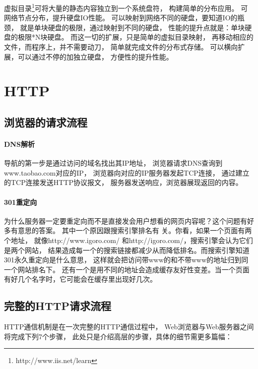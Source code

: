 \documentclass{book}
\begin{document}
虚拟目录\footnote{http://www.iis.net/learn}可将大量的静态内容独立到一个系统盘符，
构建简单的分布应用。
可网络节点分布，提升硬盘IO性能。
可以映射到网络不同的硬盘，要知道IO的瓶颈，
就是单块硬盘的极限，通过映射到不同的硬盘，
性能的提升点就是：单块硬盘的极限*N块硬盘。
而这一切的扩展，只是简单的虚拟目录映射，
再移动相应的文件，而程序上，并不需要动刀，
简单就完成文件的分布式存储。
可以横向扩展，可以通过不停的加独立硬盘，
方便性的提升性能。

\section{HTTP}

\subsection{浏览器的请求流程}

\paragraph{DNS解析}导航的第一步是通过访问的域名找出其IP地址，
浏览器请求DNS查询到www.taobao.com对应的IP，
浏览器向对应的IP服务器发起TCP连接，
通过建立的TCP连接发送HTTP协议报文，
服务器发送响应，浏览器展现返回的内容。

\paragraph{301重定向}为什么服务器一定要重定向而不是直接发会用户想看的网页内容呢？这个问题有好多有意思的答案。
其中一个原因跟搜索引擎排名有 关。你看，如果一个页面有两个地址，
就像http://www.igoro.com/ 和http://igoro.com/，搜索引擎会认为它们是两个网站，
结果造成每一个的搜索链接都减少从而降低排名。而搜索引擎知道301永久重定向是什么意思，
这样就会把访问带www的和不带www的地址归到同一个网站排名下。
还有一个是用不同的地址会造成缓存友好性变差。当一个页面有好几个名字时，它可能会在缓存里出现好几次。

\subsection{完整的HTTP请求流程}

HTTP通信机制是在一次完整的HTTP通信过程中，
Web浏览器与Web服务器之间将完成下列7个步骤，
此处只是介绍高层的步骤，具体的细节需更多篇幅：
\end{document}
